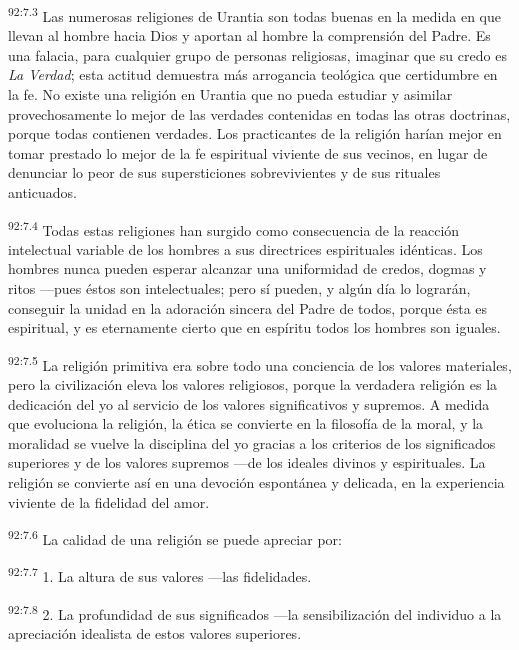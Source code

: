 \documentclass[twoside, 11pt]{book}
\begin{document}
\par
\textsuperscript{92:7.3} Las numerosas religiones de Urantia son todas buenas en la medida en que llevan al hombre hacia Dios y aportan al hombre la comprensión del Padre. Es una falacia, para cualquier grupo de personas religiosas, imaginar que su credo es \textit{La Verdad}; esta actitud demuestra más arrogancia teológica que certidumbre en la fe. No existe una religión en Urantia que no pueda estudiar y asimilar provechosamente lo mejor de las verdades contenidas en todas las otras doctrinas, porque todas contienen verdades. Los practicantes de la religión harían mejor en tomar prestado lo mejor de la fe espiritual viviente de sus vecinos, en lugar de denunciar lo peor de sus supersticiones sobrevivientes y de sus rituales anticuados.

\par
\textsuperscript{92:7.4} Todas estas religiones han surgido como consecuencia de la reacción intelectual variable de los hombres a sus directrices espirituales idénticas. Los hombres nunca pueden esperar alcanzar una uniformidad de credos, dogmas y ritos ---pues éstos son intelectuales; pero sí pueden, y algún día lo lograrán, conseguir la unidad en la adoración sincera del Padre de todos, porque ésta es espiritual, y es eternamente cierto que en espíritu todos los hombres son iguales.

\par
\textsuperscript{92:7.5} La religión primitiva era sobre todo una conciencia de los valores materiales, pero la civilización eleva los valores religiosos, porque la verdadera religión es la dedicación del yo al servicio de los valores significativos y supremos. A medida que evoluciona la religión, la ética se convierte en la filosofía de la moral, y la moralidad se vuelve la disciplina del yo gracias a los criterios de los significados superiores y de los valores supremos ---de los ideales divinos y espirituales. La religión se convierte así en una devoción espontánea y delicada, en la experiencia viviente de la fidelidad del amor.

\par
\textsuperscript{92:7.6} La calidad de una religión se puede apreciar por:

\par
\textsuperscript{92:7.7} 1. La altura de sus valores ---las fidelidades.

\par
\textsuperscript{92:7.8} 2. La profundidad de sus significados ---la sensibilización del individuo a la apreciación idealista de estos valores superiores.
\end{document}
